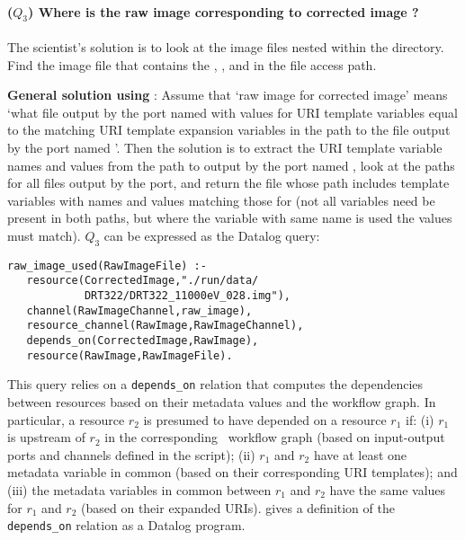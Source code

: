 \paragraph{($Q_3$)
  Where is the raw image corresponding to corrected image
  ?}
The scientist's solution is to look at the image files nested within
the  directory.  Find the image file that contains the
, , and  in the file access
path.

\textbf{General solution using \yw}: Assume that `raw image for
corrected image' means `what file output by the port named
 with values for URI template variables equal to the
matching URI template expansion variables in the path to the file
 output by the port named
'.  Then the solution is to extract the URI
template variable names and values from the path to
 output by the port named
, look at the paths for all files output by the
 port, and return the file whose path includes
template variables with names and values matching those for
 (not all variables need be present in
both paths, but where the variable with same name is used the values
must match).  $Q_3$ can be expressed as the Datalog query: 
\begin{small}
\begin{verbatim}
raw_image_used(RawImageFile) :-
   resource(CorrectedImage,"./run/data/
            DRT322/DRT322_11000eV_028.img"),
   channel(RawImageChannel,raw_image),
   resource_channel(RawImage,RawImageChannel),
   depends_on(CorrectedImage,RawImage),
   resource(RawImage,RawImageFile).
\end{verbatim}
\end{small}
This query relies on a {\tt depends\_on} relation that computes the
dependencies between resources based on their metadata values and the
workflow graph. In particular, a resource $r_2$ is presumed to have
depended on a resource $r_1$ if: (i) $r_1$ is upstream of $r_2$ in the
corresponding \YW\ workflow graph (based on input-output ports and
channels defined in the script); (ii) $r_1$ and $r_2$ have at least
one metadata variable in common (based on their corresponding URI
templates); and (iii) the metadata variables in common between $r_1$
and $r_2$ have the same values for $r_1$ and $r_2$ (based on their
expanded URIs).  gives a definition of the {\tt
  depends\_on} relation as a Datalog program.

